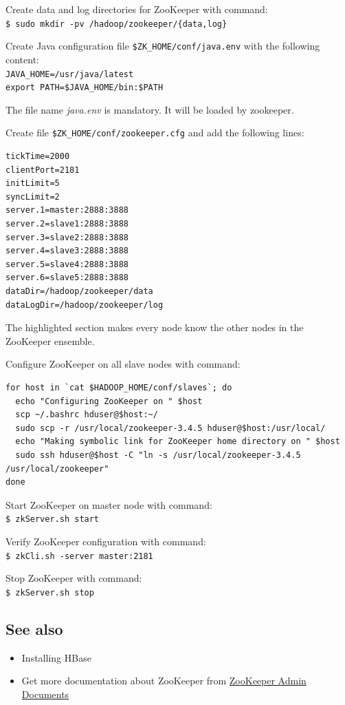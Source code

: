 Create data and log directories for ZooKeeper with command:\\
\verb|$ sudo mkdir -pv /hadoop/zookeeper/{data,log}|

Create Java configuration file \verb|$ZK_HOME/conf/java.env| with the following content:\\
\verb|JAVA_HOME=/usr/java/latest| \\
\verb|export PATH=$JAVA_HOME/bin:$PATH|

The file name \emph{java.env} is mandatory. It will be loaded by zookeeper.

Create file \verb|$ZK_HOME/conf/zookeeper.cfg| and add the following lines:
\begin{verbatim}
tickTime=2000
clientPort=2181
initLimit=5
syncLimit=2
server.1=master:2888:3888
server.2=slave1:2888:3888
server.3=slave2:2888:3888
server.4=slave3:2888:3888
server.5=slave4:2888:3888
server.6=slave5:2888:3888
dataDir=/hadoop/zookeeper/data
dataLogDir=/hadoop/zookeeper/log
\end{verbatim}

The highlighted section makes every node know the other nodes in the ZooKeeper ensemble.

Configure ZooKeeper on all slave nodes with command:
\begin{verbatim}
for host in `cat $HADOOP_HOME/conf/slaves`; do
  echo "Configuring ZooKeeper on " $host
  scp ~/.bashrc hduser@$host:~/
  sudo scp -r /usr/local/zookeeper-3.4.5 hduser@$host:/usr/local/
  echo "Making symbolic link for ZooKeeper home directory on " $host
  sudo ssh hduser@$host -C "ln -s /usr/local/zookeeper-3.4.5 /usr/local/zookeeper"
done
\end{verbatim}

Start ZooKeeper on master node with command: \\
\verb|$ zkServer.sh start|

Verify ZooKeeper configuration with command: \\
\verb|$ zkCli.sh -server master:2181|

Stop ZooKeeper with command: \\
\verb|$ zkServer.sh stop|

\subsection*{See also}
\begin{itemize}
  \item Installing HBase
  \item Get more documentation about ZooKeeper from \href{http://zookeeper.apache.org/doc/r3.4.5/zookeeperAdmin.html}{ZooKeeper Admin Documents}
\end{itemize}

